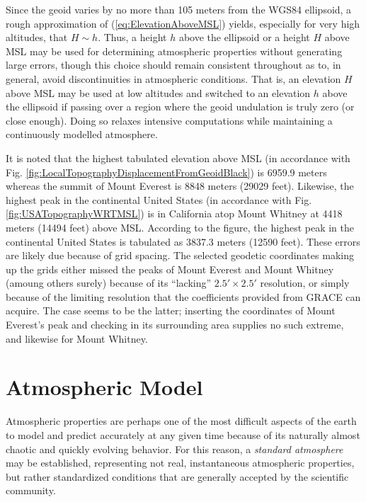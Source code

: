 \documentclass[11pt,dvipsnames]{thesis}
\begin{document}
Since the geoid varies by no more than 105 meters from the WGS84 ellipsoid, a rough approximation of (\ref{eq:ElevationAboveMSL}) yields, especially for very high altitudes, that $H \sim h$. Thus, a height $h$ above the ellipsoid or a height $H$ above MSL may be used for determining atmospheric properties without generating large errors, though this choice should remain consistent throughout as to, in general, avoid discontinuities in atmospheric conditions. That is, an elevation $H$ above MSL may be used at low altitudes and switched to an elevation $h$ above the ellipsoid if passing over a region where the geoid undulation is truly zero (or close enough). Doing so relaxes intensive computations while maintaining a continuously modelled atmosphere.

It is noted that the highest tabulated elevation above MSL (in accordance with Fig. \ref{fig:LocalTopographyDisplacementFromGeoidBlack}) is 6959.9 meters whereas the summit of Mount Everest is 8848 meters (29029 feet). Likewise, the highest peak in the continental United States (in accordance with Fig. \ref{fig:USATopographyWRTMSL}) is in California atop Mount Whitney at 4418 meters (14494 feet) above MSL. According to the figure, the highest peak in the continental United States is tabulated as 3837.3 meters (12590 feet). These errors are likely due because of grid spacing. The selected geodetic coordinates making up the grids either missed the peaks of Mount Everest and Mount Whitney (amoung others surely) because of its ``lacking'' $2.5' \times 2.5'$ resolution, or simply because of the limiting resolution that the coefficients provided from GRACE can acquire.
The case seems to be the latter; inserting the coordinates of Mount Everest's peak and checking in its surrounding area supplies no such extreme, and likewise for Mount Whitney.


\section{Atmospheric Model}

Atmospheric properties are perhaps one of the most difficult aspects of the earth to model and predict accurately at any given time because of its naturally almost chaotic and quickly evolving behavior. For this reason, a \textit{standard atmosphere} may be established, representing not real, instantaneous atmospheric properties, but rather standardized conditions that are generally accepted by the scientific community.
\end{document}
